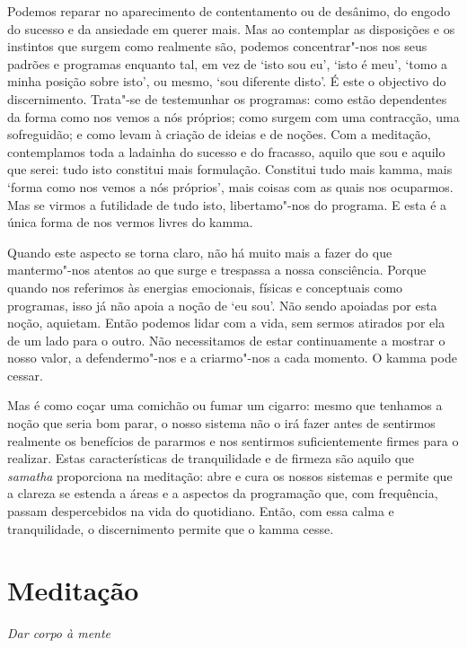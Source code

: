Podemos reparar no aparecimento de contentamento ou de desânimo, do engodo do
sucesso e da ansiedade em querer mais. Mas ao contemplar as disposições e os
instintos que surgem como realmente são, podemos concentrar"-nos nos seus padrões
e programas enquanto tal, em vez de `isto sou eu', `isto é meu', `tomo a minha
posição sobre isto', ou mesmo, `sou diferente disto'. É este o objectivo do
discernimento. Trata"-se de testemunhar os programas: como estão dependentes da
forma como nos vemos a nós próprios; como surgem com uma contracção, uma
sofreguidão; e como levam à criação de ideias e de noções. Com a meditação,
contemplamos toda a ladainha do sucesso e do fracasso, aquilo que sou e aquilo
que serei: tudo isto constitui mais formulação. Constitui tudo mais kamma, mais
`forma como nos vemos a nós próprios', mais coisas com as quais nos ocuparmos.
Mas se virmos a futilidade de tudo isto, libertamo"-nos do programa. E esta é a
única forma de nos vermos livres do kamma.

Quando este aspecto se torna claro, não há muito mais a fazer do que
mantermo"-nos atentos ao que surge e trespassa a nossa consciência. Porque quando
nos referimos às energias emocionais, físicas e conceptuais como programas, isso
já não apoia a noção de `eu sou'. Não sendo apoiadas por esta noção, aquietam.
Então podemos lidar com a vida, sem sermos atirados por ela de um lado para o
outro. Não necessitamos de estar continuamente a mostrar o nosso valor, a
defendermo"-nos e a criarmo"-nos a cada momento. O kamma pode cessar.

Mas é como coçar uma comichão ou fumar um cigarro: mesmo que tenhamos a noção
que seria bom parar, o nosso sistema não o irá fazer antes de sentirmos
realmente os benefícios de pararmos e nos sentirmos suficientemente firmes para
o realizar. Estas características de tranquilidade e de firmeza são aquilo que
\emph{samatha} proporciona na meditação: abre e cura os nossos sistemas e
permite que a clareza se estenda a áreas e a aspectos da programação que, com
frequência, passam despercebidos na vida do quotidiano. Então, com essa calma e
tranquilidade, o discernimento permite que o kamma cesse.

\clearpage

\section[Meditação: dar corpo à mente]{Meditação}

{\centering
\subSectionFont\selectfont
\textit{Dar corpo à mente}
\par}

